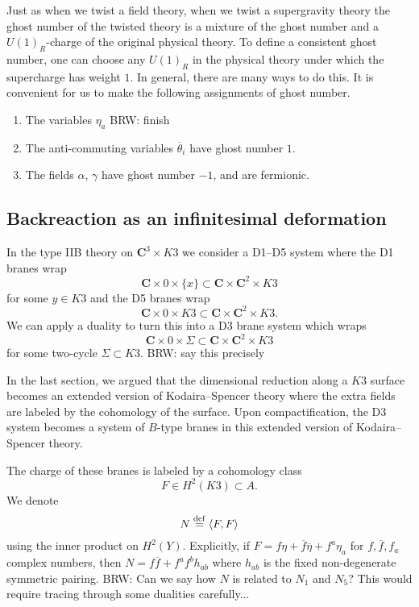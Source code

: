 \documentclass[11pt]{amsart}
\newcommand{\br}{\overline}
\def\define{\overset{\rm def}{=}}
\newcommand{\ip}[1]{\left\langle #1 \right\rangle}
\newcommand\C{\mathbf{C}}
\def\brian#1{{\textcolor{blue!65!red}{BRW: {#1}}}}
\newcommand\beqn{\begin{equation}}
\newcommand\eeqn{\end{equation}}
\theoremstyle{thm}
\numberwithin{equation}{subsection}
\theoremstyle{def}
\theoremstyle{rem}
\begin{document}
Just as when we twist a field theory, when we twist a supergravity theory the ghost number of the twisted theory  is a mixture of the ghost number and a $U(1)_R$-charge of the original physical theory. To define a consistent ghost number, one can choose any $U(1)_R$ in the physical theory under which the supercharge has weight $1$.  In general, there are many ways to do this.  It is convenient for us to make the following assignments of ghost number.
\begin{enumerate} 
	\item The variables $\eta_a$ \brian{finish}
	\item The anti-commuting variables $\br{\theta}_i$ have ghost number $1$.
	\item The fields $\alpha$, $\gamma$ have ghost number $-1$, and are fermionic.
\end{enumerate}

\subsection{Backreaction as an infinitesimal deformation} 
\label{sec:conifold}

In the type IIB theory on $\C^3 \times K3$ we consider a D1--D5 system where the D1 branes wrap 
\[
\C \times 0 \times \{x\} \subset \C \times \C^2 \times K3 
\]
for some $y \in K3$ and the D5 branes wrap 
\[
\C \times 0 \times K3 \subset \C \times \C^2 \times K3 .
\]
We can apply a duality to turn this into a D3 brane system which wraps 
\[
\C \times 0 \times \Sigma \subset \C \times \C^2 \times K3 
\]
for some two-cycle $\Sigma \subset K3$. 
\brian{say this precisely}

In the last section, we argued that the dimensional reduction along a $K3$ surface becomes an extended version of Kodaira--Spencer theory where the extra fields are labeled by the cohomology of the surface.
Upon compactification, the D3 system becomes a system of $B$-type branes in this extended version of Kodaira--Spencer theory. 

The charge of these branes is labeled by a cohomology class 
\beqn
F \in H^2(K3) \subset A .
\eeqn
We denote 
\beqn
N \define \ip{F, F}
\eeqn
using the inner product on $H^2(Y)$. 
Explicitly, if $F = f \eta + \br f \br \eta + f^a \eta_a$ for $f, \br f, f_a$ complex numbers, then $N = f \br f + f^{a} f^{b} h_{ab}$ where $h_{ab}$ is the fixed non-degenerate symmetric pairing. 
\brian{Can we say how $N$ is related to $N_1$ and $N_5$? This would require tracing through some dualities carefully...}
\end{document}
